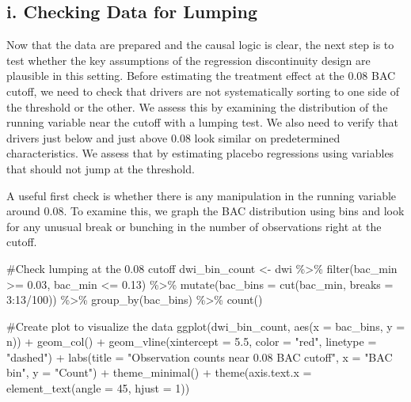 \documentclass[
  letterpaper,
  DIV=11,
  numbers=noendperiod]{scrartcl}
\newenvironment{Shaded}{\begin{snugshade}}{\end{snugshade}}
\newcommand{\AttributeTok}[1]{\textcolor[rgb]{0.40,0.45,0.13}{#1}}
\newcommand{\CommentTok}[1]{\textcolor[rgb]{0.37,0.37,0.37}{#1}}
\newcommand{\DecValTok}[1]{\textcolor[rgb]{0.68,0.00,0.00}{#1}}
\newcommand{\FloatTok}[1]{\textcolor[rgb]{0.68,0.00,0.00}{#1}}
\newcommand{\FunctionTok}[1]{\textcolor[rgb]{0.28,0.35,0.67}{#1}}
\newcommand{\NormalTok}[1]{\textcolor[rgb]{0.00,0.23,0.31}{#1}}
\newcommand{\OtherTok}[1]{\textcolor[rgb]{0.00,0.23,0.31}{#1}}
\newcommand{\SpecialCharTok}[1]{\textcolor[rgb]{0.37,0.37,0.37}{#1}}
\newcommand{\StringTok}[1]{\textcolor[rgb]{0.13,0.47,0.30}{#1}}
\begin{document}
\subsection{i. Checking Data for
Lumping}\label{i.-checking-data-for-lumping}

Now that the data are prepared and the causal logic is clear, the next
step is to test whether the key assumptions of the regression
discontinuity design are plausible in this setting. Before estimating
the treatment effect at the 0.08 BAC cutoff, we need to check that
drivers are not systematically sorting to one side of the threshold or
the other. We assess this by examining the distribution of the running
variable near the cutoff with a lumping test. We also need to verify
that drivers just below and just above 0.08 look similar on
predetermined characteristics. We assess that by estimating placebo
regressions using variables that should not jump at the threshold.

A useful first check is whether there is any manipulation in the running
variable around 0.08. To examine this, we graph the BAC distribution
using bins and look for any unusual break or bunching in the number of
observations right at the cutoff.

\begin{Shaded}
\begin{Highlighting}[]
\CommentTok{\#Check lumping at the 0.08 cutoff}
\NormalTok{dwi\_bin\_count }\OtherTok{\textless{}{-}}\NormalTok{ dwi }\SpecialCharTok{\%\textgreater{}\%}
  \FunctionTok{filter}\NormalTok{(bac\_min }\SpecialCharTok{\textgreater{}=} \FloatTok{0.03}\NormalTok{, bac\_min }\SpecialCharTok{\textless{}=} \FloatTok{0.13}\NormalTok{) }\SpecialCharTok{\%\textgreater{}\%}
  \FunctionTok{mutate}\NormalTok{(}\AttributeTok{bac\_bins =} \FunctionTok{cut}\NormalTok{(bac\_min, }\AttributeTok{breaks =} \DecValTok{3}\SpecialCharTok{:}\DecValTok{13}\SpecialCharTok{/}\DecValTok{100}\NormalTok{)) }\SpecialCharTok{\%\textgreater{}\%}
  \FunctionTok{group\_by}\NormalTok{(bac\_bins) }\SpecialCharTok{\%\textgreater{}\%}
  \FunctionTok{count}\NormalTok{()}

\CommentTok{\#Create plot to visualize the data}
\FunctionTok{ggplot}\NormalTok{(dwi\_bin\_count, }\FunctionTok{aes}\NormalTok{(}\AttributeTok{x =}\NormalTok{ bac\_bins, }\AttributeTok{y =}\NormalTok{ n)) }\SpecialCharTok{+}
  \FunctionTok{geom\_col}\NormalTok{() }\SpecialCharTok{+}
  \FunctionTok{geom\_vline}\NormalTok{(}\AttributeTok{xintercept =} \FloatTok{5.5}\NormalTok{,}
             \AttributeTok{color =} \StringTok{"red"}\NormalTok{, }\AttributeTok{linetype =} \StringTok{"dashed"}\NormalTok{) }\SpecialCharTok{+}
  \FunctionTok{labs}\NormalTok{(}\AttributeTok{title =} \StringTok{"Observation counts near 0.08 BAC cutoff"}\NormalTok{,}
       \AttributeTok{x =} \StringTok{"BAC bin"}\NormalTok{, }\AttributeTok{y =} \StringTok{"Count"}\NormalTok{) }\SpecialCharTok{+}
  \FunctionTok{theme\_minimal}\NormalTok{() }\SpecialCharTok{+}
  \FunctionTok{theme}\NormalTok{(}\AttributeTok{axis.text.x =} \FunctionTok{element\_text}\NormalTok{(}\AttributeTok{angle =} \DecValTok{45}\NormalTok{, }\AttributeTok{hjust =} \DecValTok{1}\NormalTok{))}
\end{Highlighting}
\end{Shaded}
\end{document}
